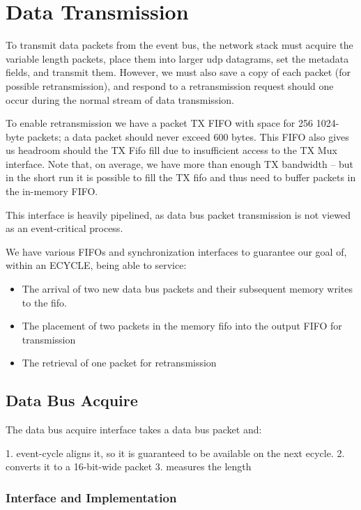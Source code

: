 \section{Data Transmission}

To transmit data packets from the event bus, the network stack must
acquire the variable length packets, place them into larger udp
datagrams, set the metadata fields, and transmit them. However, we
must also save a copy of each packet (for possible retransmission),
and respond to a retransmission request should one occur during the
normal stream of data transmission.

To enable retransmission we have a packet TX FIFO with space for 256
1024-byte packets; a data packet should never exceed 600 bytes. This
FIFO also gives us headroom should the TX Fifo fill due to
insufficient access to the TX Mux interface. Note that, on average, we
have more than enough TX bandwidth -- but in the short run it is
possible to fill the TX fifo and thus need to buffer packets in the
in-memory FIFO.

This interface is heavily pipelined, as data bus packet transmission
is not viewed as an event-critical process.

We have various FIFOs and synchronization interfaces to guarantee our
goal of, within an ECYCLE, being able to service:

\begin{itemize}
\item The arrival of two new data bus packets and their subsequent
  memory writes to the fifo.
\item The placement of two packets in the memory fifo into the output
  FIFO for transmission
\item The retrieval of one packet for retransmission
\end{itemize}

\subsection{Data Bus Acquire}
The data bus acquire interface takes a data bus packet and: 

1. event-cycle aligns it, so it is guaranteed to be available on the
   next ecycle.
2. converts it to a 16-bit-wide packet
3. measures the length

\subsubsection{Interface and Implementation} 

